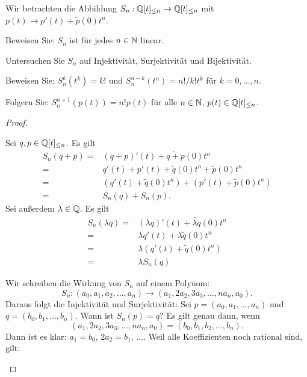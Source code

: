 \begin{Problem}
	Wir betrachten die Abbildung $S_n:\mathbb{Q}[t]_{\le n}\to \mathbb{Q}[t]_{\le n}$ mit $p(t)\to p'(t)+\tilde{p}(0)t^n$.
	\begin{parts}
	\item Beweisen Sie: $S_n$ ist f\"{u}r jedes $n\in \mathbb{N}$ linear.
	\item Untersuchen Sie $S_n$ auf Injektivität, Surjektivität und Bijektivität.
	\item Beweisen Sie: $S_n^k(t^k)=k!$ und $S_n^{n-k}(t^n)=n! / k!t^k$ f\"{u}r $k=0,\dots,n$.
	\item Folgern Sie: $S_n^{n+1}(p(t))=n!p(t)$ f\"{u}r alle $n\in \mathbb{N}$, $p(t)\in \mathbb{Q}[t]_{\le n}$.
	\end{parts}
\end{Problem}
\begin{proof}
	\begin{parts}
	\item Sei $q,p\in \mathbb{Q}[t]_{\le n}$. Es gilt
		\begin{align*}
			S_n(q+p)=&(q+p)'(t)+\widetilde{q+p}(0)t^n\\
			=&q'(t)+p'(t)+\tilde{q}(0)t^n+\tilde{p}(0)t^n\\
			=&(q'(t)+\tilde{q}(0)t^n)+(p'(t)+\tilde{p}(0)t^n)\\
			=&S_n(q)+S_n(p).
		\end{align*}
		Sei außerdem $\lambda\in \mathbb{Q}$. Es gilt
		\begin{align*}
			S_n(\lambda q)=&(\lambda q)'(t)+\widetilde{\lambda q}(0)t^n\\
			=&\lambda q'(t)+\lambda\tilde{q}(0)t^n\\
			=&\lambda\left( q'(t)+\tilde{q}(0)t^n \right) \\
			=&\lambda S_n(q)
		\end{align*}
	\item Wir schreiben die Wirkung von $S_n$ auf einem Polynom:
		\[
		S_n:(a_0,a_1,a_2,\dots, a_n)\to (a_1,2a_2,3a_3,\dots, na_n, a_0)
		.\] 
		Daraus folgt die Injektivität und Surjektivität: Sei $p=(a_0,a_1,\dots, a_n)$ und $q=(b_0,b_1,\dots, b_n)$. Wann ist $S_n(p)=q$? Es gilt genau dann, wenn
		\[
			(a_1,2a_2,3a_3,\dots, na_n, a_0)=(b_0,b_1,b_2,\dots, b_n)
		.\] 
		Dann ist es klar: $a_1=b_0$, $2a_2=b_1$, $\dots$. Weil alle Koeffizienten noch rational sind, gilt: 
	\end{parts}
\end{proof}
